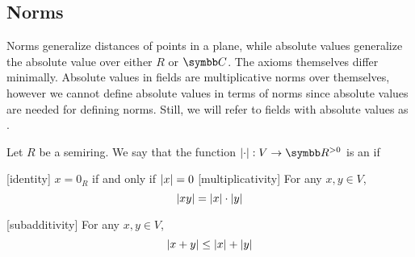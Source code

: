 \subsection{Norms}\label{subsec:norms}

\begin{remark}\label{remark:normed_fields}
  Norms generalize distances of points in a plane, while absolute values generalize the absolute value over either \( R \) or \( \BB{C} \). The axioms themselves differ minimally. Absolute values in fields are multiplicative norms over themselves, however we cannot define absolute values in terms of norms since absolute values are needed for defining norms. Still, we will refer to fields with absolute values as .
\end{remark}

\begin{definition}\label{def:absolute_value}\cite{nLab:absolute_value}
  Let \( R \) be a semiring. We say that the function \( \Abs{\cdot}: V \to \R^{>0} \) is an  if
  \begin{description}
    [identity] \( x = 0_R \) if and only if \( \left\vert x \right\vert = 0 \)
    [multiplicativity] For any \( x, y \in V \),
    \begin{equation*}
      \left\vert xy \right\vert = \left\vert x \right\vert \cdot \left\vert y \right\vert
    \end{equation*}

    [subadditivity] For any \( x, y \in V \),
    \begin{equation*}
      \left\vert x + y \right\vert \leq \left\vert x \right\vert + \left\vert y \right\vert
    \end{equation*}
  \end{description}
\end{definition}

